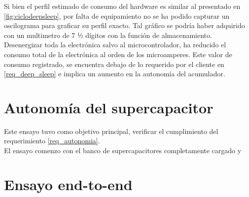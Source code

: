 Si bien el perfil estimado de consumo del hardware es similar al presentado en \ref{fig:ciclodeepsleep}, por falta de equipamiento no se ha podido capturar un oscilograma para graficar su perfil exacto. Tal gráfico se podría haber adquirido con un multimetro de 7 ½ dígitos con la función de almacenamiento.\\
Desenergizar toda la electrónica salvo al microcontrolador, ha reducido el consumo total de la electrónica al orden de los microamperes. Este valor de consumo registrado, se encuentra debajo de lo requerido por el cliente en \ref{req_deep_sleep} e implica un aumento en la autonomía del acumulador.\\


\section{Autonom\'{i}a del supercapacitor}
Este ensayo tuvo como objetivo principal, verificar el cumplimiento del requerimiento \ref{req_autonomia}.\\
El ensayo comenzo con el banco de supercapacitores completamente cargado y 

\section{Ensayo end-to-end}